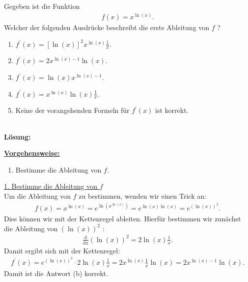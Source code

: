 \subsection*{}
Gegeben ist die Funktion
\begin{align*}
	f(x) = x^{\ln(x)}.
\end{align*}
Welcher der folgenden Ausdrücke beschreibt die erste Ableitung von $ f $ ?
\renewcommand{\labelenumi}{(\alph{enumi})}
\begin{enumerate}
	\item 
	$ f^\prime(x) = [\ln(x)]^2 x^{\ln(x)} \frac{1}{x}$.
	\item
	$ f^\prime(x) =2 x^{\ln(x) -1} \ln(x) $.
	\item
	$ f^\prime(x) = \ln(x) x^{\ln(x) -1} $.
	\item
	$ f^\prime(x) =  x^{\ln(x) }\ln(x)\frac{1}{x} $.
	\item
	Keine der vorangehenden Formeln für $ f^\prime(x)  $ ist korrekt.
\end{enumerate}
\ \\
\textbf{Lösung:}
\begin{mdframed}
\underline{\textbf{Vorgehensweise:}}
\renewcommand{\labelenumi}{\theenumi.}
\begin{enumerate}
\item Bestimme die Ableitung von $ f $.
\end{enumerate}
\end{mdframed}
\underline{1. Bestimme die Ableitung von $ f $}\\
Um die Ableitung von $ f $ zu bestimmen, wenden wir einen Trick an:
\begin{align*}
	f(x) = x^{\ln(x)} = e^{\ln(x^{\ln(x)})}
	=
	e^{\ln(x) \ln(x)}
	=
	e^{(\ln(x))^2}.
\end{align*}
Dies können wir mit der Kettenregel ableiten. Hierfür bestimmen wir zunächst die Ableitung von $ (\ln(x))^2 $ :
\begin{align*}
	\frac{\mathrm{d}}{\mathrm{dx}}
	(\ln(x))^2
	=
	2 \ln(x) \frac{1}{x}.
\end{align*}
Damit ergibt sich mit der Kettenregel:
\begin{align*}
	f^\prime(x)
	=
	e^{(\ln(x))^2} \cdot  2 \ln(x) \frac{1}{x}
	=
	2 x^{\ln(x)} \frac{1}{x} \ln(x)
	=
	2 x^{\ln(x) - 1} \ln(x).
\end{align*}
Damit ist die Antwort (b) korrekt.
\newpage
